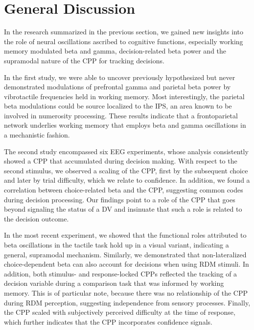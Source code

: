 
\chapter{General Discussion}

In the research summarized in the previous section, we gained new insights into the role of neural oscillations ascribed to cognitive functions, especially working memory modulated beta and gamma, decision-related beta power and the supramodal nature of the CPP for tracking decisions.

In the first study, we were able to uncover previously hypothesized but never demonstrated modulations of prefrontal gamma and parietal beta power by vibrotactile frequencies held in working memory. Most interestingly, the parietal beta modulations could be source localized to the IPS, an area known to be involved in numerosity processing. These results indicate that a frontoparietal network underlies working memory that employs beta and gamma oscillations in a mechanistic fashion.

The second study encompassed six EEG experiments, whose analysis consistently showed a CPP that accumulated during decision making. With respect to the second stimulus, we observed a scaling of the CPP, first by the subsequent choice and later by trial difficulty, which we relate to confidence. In addition, we found a correlation between choice-related beta and the CPP, suggesting common codes during decision processing. Our findings point to a role of the CPP that goes beyond signaling the status of a DV and insinuate that such a role is related to the decision outcome.

In the most recent experiment, we showed that the functional roles attributed to beta oscillations in the tactile task hold up in a visual variant, indicating a general, supramodal mechanism. Similarly, we demonstrated that non-lateralized choice-dependent beta can also account for decisions when using RDM stimuli. In addition, both stimulus- and response-locked CPPs reflected the tracking of a decision variable during a comparison task that was informed by working memory. This is of particular note, because there was no relationship of the CPP during RDM perception, suggesting independence from sensory processes. Finally, the CPP scaled with subjectively perceived difficulty at the time of response, which further indicates that the CPP incorporates confidence signals.

